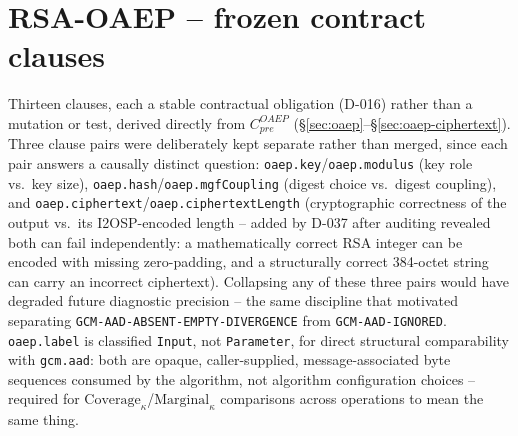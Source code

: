 \documentclass[11pt,a4paper]{article}
\begin{document}
\section{RSA-OAEP -- frozen contract clauses}\label{sec:oaep-clauses}
Thirteen clauses, each a stable contractual obligation (D-016) rather than a mutation or test, derived directly from $C_{pre}^{OAEP}$ (\S\ref{sec:oaep}--\S\ref{sec:oaep-ciphertext}). Three clause pairs were deliberately kept separate rather than merged, since each pair answers a causally distinct question: \texttt{oaep.key}/\texttt{oaep.modulus} (key role vs.\ key size), \texttt{oaep.hash}/\texttt{oaep.mgfCoupling} (digest choice vs.\ digest coupling), and \texttt{oaep.ciphertext}/\texttt{oaep.ciphertextLength} (cryptographic correctness of the output vs.\ its I2OSP-encoded length -- added by D-037 after auditing revealed both can fail independently: a mathematically correct RSA integer can be encoded with missing zero-padding, and a structurally correct 384-octet string can carry an incorrect ciphertext). Collapsing any of these three pairs would have degraded future diagnostic precision -- the same discipline that motivated separating \texttt{GCM-AAD-ABSENT-EMPTY-DIVERGENCE} from \texttt{GCM-AAD-IGNORED}. \texttt{oaep.label} is classified \texttt{Input}, not \texttt{Parameter}, for direct structural comparability with \texttt{gcm.aad}: both are opaque, caller-supplied, message-associated byte sequences consumed by the algorithm, not algorithm configuration choices -- required for $\text{Coverage}_\kappa$/$\text{Marginal}_\kappa$ comparisons across operations to mean the same thing.
\end{document}
